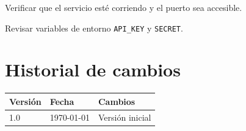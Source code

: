 \documentclass[12pt, letterpaper]{article}
\begin{document}
\begin{description}[style=nextline]
    \item[\texttt{Error: conexión rechazada}]
        Verificar que el servicio esté corriendo y el puerto sea
accesible.
    \item[\texttt{Error: credenciales inválidas}]
        Revisar variables de entorno \texttt{API\_KEY} y
\texttt{SECRET}.
\end{description}

\section{Historial de cambios}

\begin{center}
\begin{tabular}{lll}
    \toprule
    \textbf{Versión} & \textbf{Fecha} & \textbf{Cambios} \\
    \midrule
    1.0 & \today & Versión inicial \\
    \bottomrule
\end{tabular}
\end{center}
\end{document}
